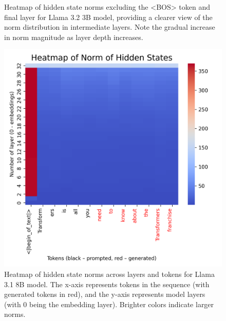 \begin{figure}[h]
\begin{minipage}{0.48\textwidth}
        \caption{Heatmap of hidden state norms excluding the <BOS> token and final layer for Llama 3.2 3B model, providing a clearer view of the norm distribution in intermediate layers. Note the gradual increase in norm magnitude as layer depth increases.}
        \label{fig:heatmap_3b_notfull}
    \end{minipage}
\end{figure}


\begin{figure}[h]
    \centering
    \begin{minipage}{0.48\textwidth}
        \centering
        \includegraphics[width=\textwidth]{images/heatmap_8b_full.png}
        \caption{Heatmap of hidden state norms across layers and tokens for Llama 3.1 8B model. The x-axis represents tokens in the sequence (with generated tokens in red), and the y-axis represents model layers (with 0 being the embedding layer). Brighter colors indicate larger norms.}
        \label{fig:heatmap_8b_full}
    \end{minipage}
    \hfill
    \begin{minipage}{0.48\textwidth}
        \centering

\end{minipage}
\end{figure}

